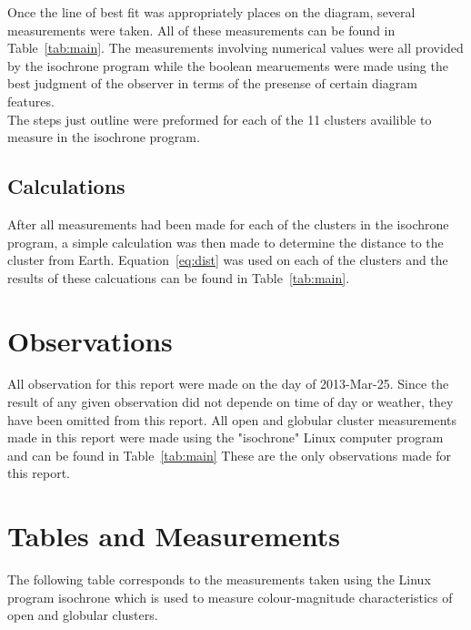 \documentclass{article}
\begin{document}
Once the line of best fit was appropriately places on the diagram, several 
measurements were taken. All of these measurements can be found in Table~\ref{tab:main}.
The measurements involving numerical values were all provided by the isochrone
program while the boolean mearuements were made using the best judgment of
the observer in terms of the presense of certain diagram features.\\

The steps just outline were preformed for each of the 11 clusters availible
to measure in the isochrone program.

\subsection{Calculations}

After all measurements had been made for each of the clusters in the isochrone program,
a simple calculation was then made to determine the distance to the cluster from
Earth. Equation~\ref{eq:dist} was used on each of the clusters and the results of
these calcuations can be found in Table~\ref{tab:main}.


\section{Observations}

All observation for this report were made on the day of 2013-Mar-25. Since the result
of any given observation did not depende on time of day or weather, they have been omitted
from this report. All open and globular cluster measurements made in this report were
made using the "isochrone" Linux computer program and can be found in Table~\ref{tab:main}
These are the only observations made for this report.


\section{Tables and Measurements}

The following table corresponds to the measurements taken using the Linux program
isochrone which is used to measure colour-magnitude characteristics of open and
globular clusters.
\end{document}
